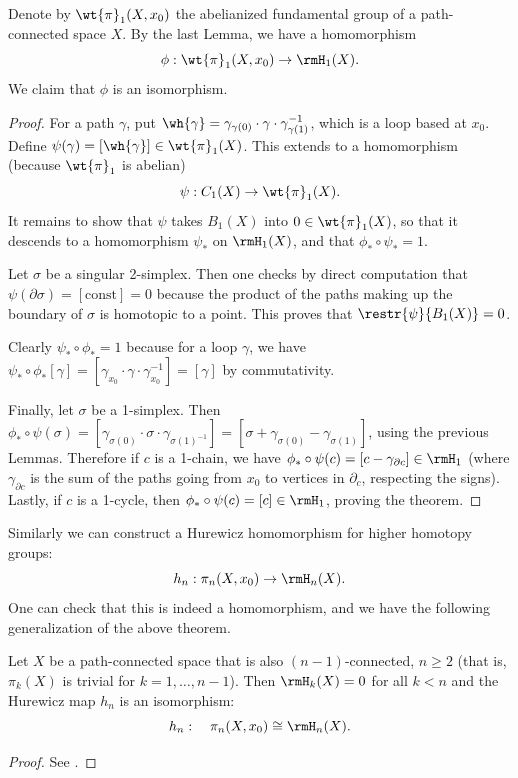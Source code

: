 \begin{thm}[Hurewicz]
    Denote by $\wt{\pi}_1(X,x_0)$ the abelianized fundamental group of a path-connected space $X$. By the last Lemma, we have a homomorphism
    \[\phi: \wt{\pi}_1(X,x_0)\to \rmH_1(X).\]
    We claim that $\phi $ is an isomorphism.
\end{thm}
\begin{proof}
     For a path $\gamma$, put $\wh{\gamma}=\gamma_{\gamma(0)}\cdot \gamma \cdot \gamma_{\gamma(1)}^{-1}$, which is a loop based at $x_0$. Define $\psi(\gamma)=[\wh{\gamma}]\in \wt{\pi}_1(X)$. This extends to a homomorphism (because $\wt{\pi}_1$ is abelian)
     \[\psi:C_1(X)\to \wt{\pi}_1(X).\]
     It remains to show that $\psi$ takes $B_1(X)$ into $0\in\wt{\pi}_1(X)$, so that it descends to a homomorphism $\psi_\ast$ on $\rmH_1(X)$, and that $\phi_\ast\circ\psi_\ast=1$.
     
     Let $\sigma$ be a singular 2-simplex. Then one checks by direct computation that $\psi(\partial\sigma)=[\text{const}]=0$ because the product of the paths making up the boundary of $\sigma$ is homotopic to a point. This proves that $\restr{\psi}{B_1(X)}=0$.
     
     Clearly $\psi_\ast \circ \phi_\ast=1$ because for a loop $\gamma$, we have $\psi_\ast \circ \phi_\ast[\gamma]=[\gamma_{x_0}\cdot \gamma\cdot \gamma_{x_0}^{-1}]=[\gamma]$ by commutativity.
     
     Finally, let $\sigma$ be a 1-simplex. Then $\phi_\ast \circ \psi(\sigma)=[\gamma_{\sigma(0)}\cdot \sigma\cdot \gamma_{\sigma(1)^{-1}}]=[\sigma+\gamma_{\sigma(0)}-\gamma_{\sigma(1)}]$, using the previous Lemmas. Therefore if $c$ is a 1-chain, we have $\phi_\ast\circ \psi(c)=[c-\gamma_{\partial c}]\in \rmH_1$ (where $\gamma_{\partial c}$ is the sum of the paths going from $x_0$ to vertices in $\partial_c$, respecting the signs). Lastly, if $c$ is a 1-cycle, then $\phi_\ast \circ\psi(c)=[c]\in \rmH_1$, proving the theorem.
\end{proof}

Similarly we can construct a Hurewicz homomorphism for higher homotopy groups:
\[h_n:\pi_n(X,x_0)\to \rmH_n(X).\]
One can check that this is indeed a homomorphism, and we have the following generalization of the above theorem.

\begin{thm}[Hurewicz]
    Let $X$ be a path-connected space that is also $(n-1)$-connected, $n\geq 2$ (that is, $\pi_k(X)$ is trivial for $k=1,\ldots,n-1$). Then $\rmH_k(X)=0$ for all $k<n$ and the Hurewicz map $h_n$ is an isomorphism:
    \[h_n:\quad \pi_n(X,x_0)\cong \rmH_n(X).\]
\end{thm}
\begin{proof}
     See \cite[Thm.\ VII.10.7]{Bredon}.
\end{proof}




